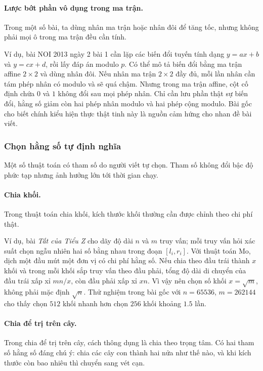 \documentclass[11pt]{article}
\begin{document}
\paragraph{Lược bớt phần vô dụng trong ma trận.}
Trong một số bài, ta dùng nhân ma trận hoặc nhân đôi để tăng tốc, nhưng không
phải mọi ô trong ma trận đều cần tính.

Ví dụ, bài NOI 2013 ngày 2 bài 1 cần lặp các biến đổi tuyến tính dạng
\(y=ax+b\) và \(y=cx+d\), rồi lấy đáp án modulo \(p\). Có thể mô tả biến đổi
bằng ma trận affine \(2\times2\) và dùng nhân đôi. Nếu nhân ma trận \(2\times2\)
đầy đủ, mỗi lần nhân cần tám phép nhân có modulo và sẽ quá chậm. Nhưng trong
ma trận affine, cột cố định chứa \(0\) và \(1\) không đổi sau mọi phép nhân.
Chỉ cần lưu phần thật sự biến đổi, hằng số giảm còn hai phép nhân modulo và hai
phép cộng modulo. Bài gốc cho biết chính kiểu hiện thực thật tinh này là nguồn
cảm hứng cho nhan đề bài viết.

\subsubsection{Chọn hằng số tự định nghĩa}

Một số thuật toán có tham số do người viết tự chọn. Tham số không đổi bậc độ
phức tạp nhưng ảnh hưởng lớn tới thời gian chạy.

\paragraph{Chia khối.}
Trong thuật toán chia khối, kích thước khối thường cần được chỉnh theo chi phí
thật.

Ví dụ, bài \emph{Tất của Tiểu Z} cho dãy độ dài \(n\) và \(m\) truy vấn; mỗi
truy vấn hỏi xác suất chọn ngẫu nhiên hai số bằng nhau trong đoạn \([l_i,r_i]\).
Với thuật toán Mo, dịch một đầu mút một đơn vị có chi phí hằng số. Nếu chia
theo đầu trái thành \(x\) khối và trong mỗi khối sắp truy vấn theo đầu phải,
tổng độ dài di chuyển của đầu trái xấp xỉ \(mn/x\), còn đầu phải xấp xỉ \(xn\).
Vì vậy nên chọn số khối \(x=\sqrt m\), không phải mặc định \(\sqrt n\). Thử
nghiệm trong bài gốc với \(n=65536\), \(m=262144\) cho thấy chọn \(512\) khối
nhanh hơn chọn \(256\) khối khoảng \(1.5\) lần.

\paragraph{Chia để trị trên cây.}
Trong chia để trị trên cây, cách thông dụng là chia theo trọng tâm. Có hai tham
số hằng số đáng chú ý: chia các cây con thành hai nửa như thế nào, và khi kích
thước còn bao nhiêu thì chuyển sang vét cạn.
\end{document}
